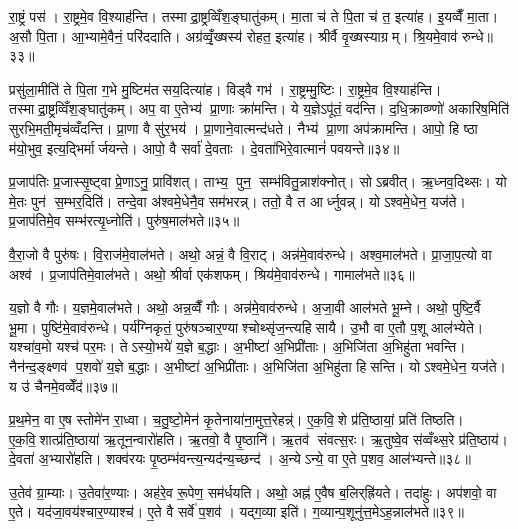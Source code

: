 रा॒ष्ट्रं पस॑। रा॒ष्ट्रमे॒व वि॒श्याह॑न्ति। तस्माद्रा॒ष्ट्रव्विँश॒ङ्घातु॑कम्। मा॒ता च॑ ते पि॒ता च॑ त॒ इत्या॑ह। इ॒यव्वैँ मा॒ता। अ॒सौ पि॒ता। आ॒भ्यामे॒वैनं॒ परि॑ददाति। अग्र॑व्वृँ॒ख्षस्य॑ रोहत॒ इत्या॑ह। श्रीर्वै वृ॒ख्षस्याग्रम्। श्रि॒यमे॒वाव॑ रुन्धे॥३३॥

प्रसु॑ला॒मीति॑ ते पि॒ता ग॒भे मु॒ष्टिम॑तसय॒दित्या॑ह। विड्वै गभ॑। रा॒ष्ट्रम्मु॒ष्टिः। रा॒ष्ट्रमे॒व वि॒श्याह॑न्ति। तस्माद्रा॒ष्ट्रव्विँश॒ङ्घातु॑कम्। अप॒ वा ए॒तेभ्य॑ प्रा॒णाः क्रा॑मन्ति। ये य॒ज्ञेऽपू॑तं॒ वद॑न्ति। द॒धि॒क्राव्ण्णो॑ अकारिष॒मिति॑ सुरभि॒मती॒मृच॑व्वँदन्ति। प्रा॒णा वै सु॑र॒भय॑। प्रा॒णाने॒वात्मन्द॑धते। नैभ्य॑ प्रा॒णा अप॑क्रामन्ति। आपो॒ हि ष्ठा म॑यो॒भुव॒ इत्य॒द्भिर्मार्जयन्ते। आपो॒ वै सर्वा॑ दे॒वताः। दे॒वता॑भिरे॒वात्मानं॑ पवयन्ते॥३४॥\anuvakamend[रा॒ष्ट्रस्य॒ मध्यं॒ पुष्य॑ति॒ गभो॑ रुन्धे दधते च॒त्वारि॑ च]

प्र॒जाप॑तिः प्र॒जास्सृ॒ष्ट्वा प्रे॒णाऽनु॒ प्रावि॑शत्। ताभ्य॒ पुन॒ सम्भ॑वितु॒न्नाश॑क्नोत्। सोऽब्रवीत्। ऋ॒ध्नव॒दिथ्सः। यो मे॒तः पुन॑ स॒म्भर॒दिति॑। तन्दे॒वा अ॑श्वमे॒धेनै॒व सम॑भरन्न्। ततो॒ वै त आर्ध्नुवन्न्। योऽश्वमे॒धेन॒ यज॑ते। प्र॒जाप॑तिमे॒व सम्भ॑रत्यृ॒ध्नोति॑। पुरु॑ष॒माल॑भते॥३५॥

वै॒रा॒जो वै पुरु॑षः। वि॒राज॑मे॒वाल॑भते। अथो॒ अन्नं॒ वै वि॒राट्। अन्न॑मे॒वाव॑रुन्धे। अश्व॒माल॑भते। प्रा॒जा॒प॒त्यो वा अश्व॑। प्र॒जाप॑तिमे॒वाल॑भते। अथो॒ श्रीर्वा एक॑शफम्। श्रिय॑मे॒वाव॑रुन्धे। गामाल॑भते॥३६॥

य॒ज्ञो वै गौः। य॒ज्ञमे॒वाल॑भते। अथो॒ अन्न॒व्वैँ गौः। अन्न॑मे॒वाव॑रुन्धे। अ॒जा॒वी आल॑भते भू॒म्ने। अथो॒ पुष्टि॒र्वै भू॒मा। पुष्टि॑मे॒वाव॑रुन्धे। पर्य॑ग्निकृतं॒ पुरु॑षञ्चार॒ण्याश्चोथ्सृ॑ज॒न्त्यहिसायै। उ॒भौ वा ए॒तौ प॒शू आल॑भ्येते। यश्चा॑व॒मो यश्च॑ पर॒मः। तेऽस्यो॒भये॑ य॒ज्ञे ब॒द्धाः। अ॒भीष्टा॑ अ॒भिप्री॑ताः। अ॒भिजि॑ता अ॒भिहु॑ता भवन्ति। नैन॑न्द॒ङ्क्ष्णव॑ प॒शवो॑ य॒ज्ञे ब॒द्धाः। अ॒भीष्टा॑ अ॒भिप्री॑ताः। अ॒भिजि॑ता अ॒भिहु॑ता हिसन्ति। योऽश्वमे॒धेन॒ यज॑ते। य उ॑ चैनमे॒वव्वेँद॑॥३७॥\anuvakamend[ल॒भ॒ते॒ गामाल॑भते पर॒मोऽष्टौ च॑]

प्र॒थ॒मेन॒ वा ए॒ष स्तोमे॑न रा॒ध्वा। च॒तु॒ष्टो॒मेन॑ कृ॒तेनाया॑ना॒मुत्त॒रेहन्न्॑। ए॒क॒वि॒शे प्र॑ति॒ष्ठायां॒ प्रति॑ तिष्ठति। ए॒क॒वि॒शात्प्र॑ति॒ष्ठाया॑ ऋ॒तून॒न्वारो॑हति। ऋ॒तवो॒ वै पृ॒ष्ठानि॑। ऋ॒तव॑ संवत्स॒रः। ऋ॒तुष्वे॒व स॑व्वँथ्स॒रे प्र॑ति॒ष्ठाय॑। दे॒वता॑ अ॒भ्यारो॑हति। शक्व॑रयः पृ॒ष्ठम्भ॑वन्त्य॒न्यद॑न्य॒च्छन्द॑। अ॒न्येऽन्ये॒ वा ए॒ते प॒शव॒ आल॑भ्यन्ते॥३८॥

उ॒तेव॑ ग्रा॒म्याः। उ॒तेवा॑र॒ण्याः। अह॑रे॒व रू॒पेण॒ सम॑र्धयति। अथो॒ अह्न॑ ए॒वैष ब॒लिर्‌ह्रि॑यते। तदा॑हुः। अप॑शवो॒ वा ए॒ते। यद॑जा॒वय॑श्चार॒ण्याश्च॑। ए॒ते वै सर्वे॑ प॒शव॑। यद्ग॒व्या इति॑। ग॒व्यान्प॒शूनु॑त्त॒मेऽह॒न्नाल॑भते॥३९॥

